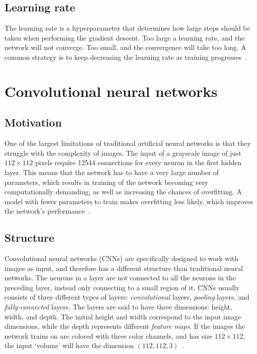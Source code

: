 \documentclass{kththesis}
\begin{document}
\subsection{Learning rate}
The learning rate is a hyperparameter that determines how large steps should be taken when performing the gradient descent. Too large a learning rate, and the network will not converge. Too small, and the convergence will take too long. A common strategy is to keep decreasing the learning rate as training progresses~\cite{Bottou2012}.

\section{Convolutional neural networks}

\subsection{Motivation}
One of the largest limitations of traditional artificial neural networks is that they struggle with the complexity of images. The input of a grayscale image of just $112 \times 112$ pixels require \num{12544} connections for every neuron in the first hidden layer. This means that the network has to have a very large number of parameters, which results in training of the network becoming very computationally demanding, as well as increasing the chances of overfitting. A model with fewer parameters to train makes overfitting less likely, which improves the network's performance~\cite{cnnIntro}.

\subsection{Structure}
Convolutional neural networks (CNNs) are specifically designed to work with images as input, and therefore has a different structure than traditional neural networks.
The neurons in a layer are not connected to all the neurons in the preceding layer, instead only connecting to a small region of it.
CNNs usually consists of three different types of layers: \textit{convolutional} layers, \textit{pooling} layers, and \textit{fully-connected} layers.
The layers are said to have three dimensions: height, width, and depth. The initial height and width correspond to the input image dimensions, while the depth represents different \textit{feature maps}.
If the images the network trains on are colored with three color channels, and has size $112 \times 112$, the input `volume' will have the dimension $(112, 112, 3)$~\cite{cnnIntro}.
\end{document}
